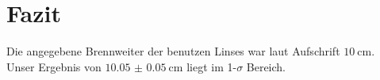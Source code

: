 \section{Fazit}
Die angegebene Brennweiter der benutzen Linses war laut Aufschrift $\SI{10}{\centi\meter}$. Unser Ergebnis von $\SI{10.05(5)}{\centi\meter}$ liegt im 1-$\sigma$ Bereich. 